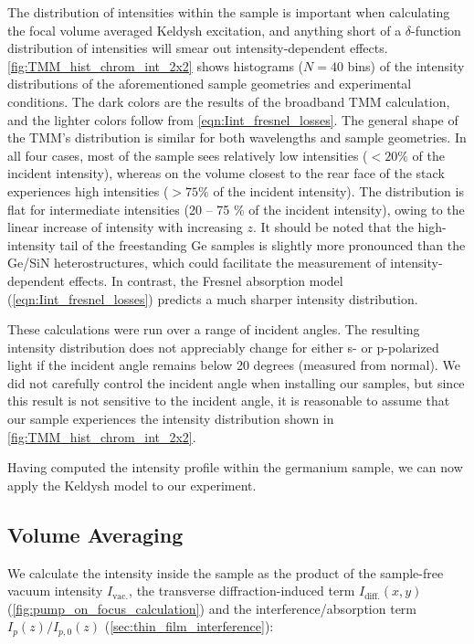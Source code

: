 The distribution of intensities within the sample is important when calculating the focal volume averaged Keldysh excitation, and anything short of a $\delta$-function distribution of intensities will smear out intensity-dependent effects. \cref{fig:TMM_hist_chrom_int_2x2} shows histograms ($N = 40$ bins) of the intensity distributions of the aforementioned sample geometries and experimental conditions. The dark colors are the results of the broadband TMM calculation, and the lighter colors follow from \cref{eqn:Iint_fresnel_losses}. The general shape of the TMM's distribution is similar for both wavelengths and sample geometries. In all four cases, most of the sample sees relatively low intensities ($<20\%$ of the incident intensity), whereas on the volume closest to the rear face of the stack experiences high intensities ($>75\%$ of the incident intensity). The distribution is flat for intermediate intensities ({20 -- 75 \%} of the incident intensity), owing to the linear increase of intensity with increasing $z$. It should be noted that the high-intensity tail of the freestanding Ge samples is slightly more pronounced than the Ge/SiN heterostructures, which could facilitate the measurement of intensity-dependent effects. In contrast, the Fresnel absorption model (\cref{eqn:Iint_fresnel_losses}) predicts a much sharper intensity distribution.

These calculations were run over a range of incident angles. The resulting intensity distribution does not appreciably change for either s- or p-polarized light if the incident angle remains below 20 degrees (measured from normal). We did not carefully control the incident angle when installing our samples, but since this result is not sensitive to the incident angle, it is reasonable to assume that our sample experiences the intensity distribution shown in \cref{fig:TMM_hist_chrom_int_2x2}.

Having computed the intensity profile within the germanium sample, we can now apply the Keldysh model to our experiment.

\subsection{Volume Averaging}
\label{sec:volume_averaging}

We calculate the intensity inside the sample as the product of the sample-free vacuum intensity $I_{\textrm{vac.}}$, the transverse diffraction-induced term $I_{\textrm{diff.}}(x, y)$ (\cref{fig:pump_on_focus_calculation}) and the interference/absorption term $I_p(z) / I_{p,0}(z)$ (\cref{sec:thin_film_interference}):

